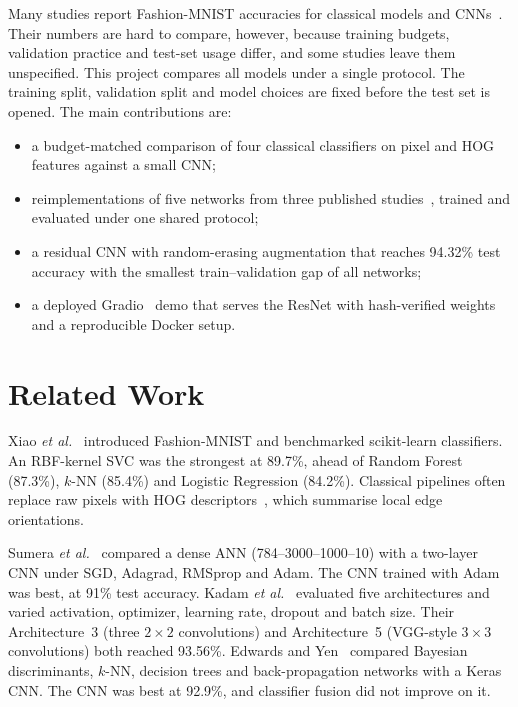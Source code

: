 \documentclass[conference]{IEEEtran}
\begin{document}
Many studies report Fashion-MNIST accuracies for classical models and CNNs~\cite{xiao2017fashion,kadam2020cnn,sumera2022cnn,edwards2019fashion,bhatnagar2017classification}. Their numbers are hard to compare, however, because training budgets, validation practice and test-set usage differ, and some studies leave them unspecified. This project compares all models under a single protocol. The training split, validation split and model choices are fixed before the test set is opened. The main contributions are:
\begin{itemize}
\item a budget-matched comparison of four classical classifiers on pixel and HOG features against a small CNN;
\item reimplementations of five networks from three published studies~\cite{sumera2022cnn,kadam2020cnn,edwards2019fashion}, trained and evaluated under one shared protocol;
\item a residual CNN with random-erasing augmentation that reaches 94.32\% test accuracy with the smallest train--validation gap of all networks;
\item a deployed Gradio~\cite{abid2019gradio} demo that serves the ResNet with hash-verified weights and a reproducible Docker setup.
\end{itemize}

\section{Related Work}
Xiao \textit{et al.}~\cite{xiao2017fashion} introduced Fashion-MNIST and benchmarked scikit-learn classifiers. An RBF-kernel SVC was the strongest at 89.7\%, ahead of Random Forest (87.3\%), $k$-NN (85.4\%) and Logistic Regression (84.2\%). Classical pipelines often replace raw pixels with HOG descriptors~\cite{dalal2005hog}, which summarise local edge orientations.

Sumera \textit{et al.}~\cite{sumera2022cnn} compared a dense ANN (784--3000--1000--10) with a two-layer CNN under SGD, Adagrad, RMSprop and Adam. The CNN trained with Adam was best, at 91\% test accuracy. Kadam \textit{et al.}~\cite{kadam2020cnn} evaluated five architectures and varied activation, optimizer, learning rate, dropout and batch size. Their Architecture~3 (three $2\times2$ convolutions) and Architecture~5 (VGG-style $3\times3$ convolutions) both reached 93.56\%. Edwards and Yen~\cite{edwards2019fashion} compared Bayesian discriminants, $k$-NN, decision trees and back-propagation networks with a Keras CNN. The CNN was best at 92.9\%, and classifier fusion did not improve on it.
\end{document}
